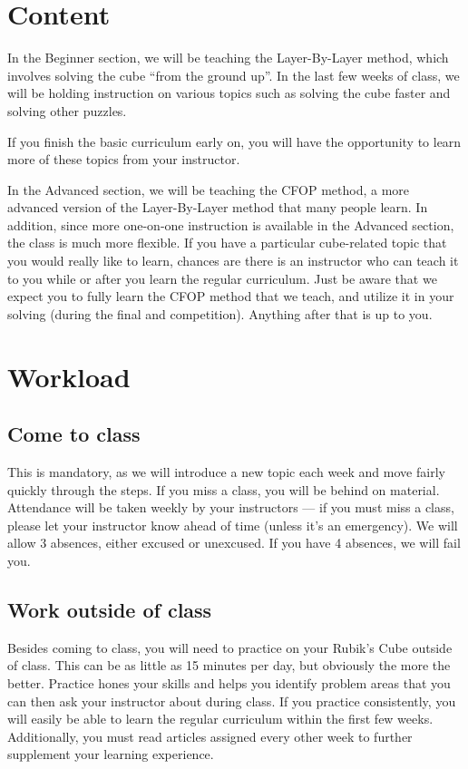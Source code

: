 \documentclass[11pt]{article}
\begin{document}
\section*{Content}
In the Beginner section, we will be teaching the Layer-By-Layer method, which involves solving the cube “from the ground up”. In the last few weeks of class, we will be holding instruction on various topics such as solving the cube faster and solving other puzzles. 

If you finish the basic curriculum early on, you will have the opportunity to learn more of these topics from your instructor.

In the Advanced section, we will be teaching the CFOP method, a more advanced version of the Layer-By-Layer method that many people learn. In addition, since more one-on-one instruction is available in the Advanced section, the class is much more flexible. If you have a particular cube-related topic that you would really like to learn, chances are there is an instructor who can teach it to you while or after you learn the regular curriculum. Just be aware that we expect you to fully learn the CFOP method that we teach, and utilize it in your solving (during the final and competition). Anything after that is up to you.



\section*{Workload}
\subsection*{Come to class}
This is mandatory, as we will introduce a new topic each week and move fairly quickly through the steps. If you miss a class, you will be behind on material. Attendance will be taken weekly by your instructors — if you must miss a class, please let your instructor know ahead of time (unless it’s an emergency). We will allow 3 absences, either excused or unexcused. If you have 4 absences, we will fail you.

\subsection*{Work outside of class}
Besides coming to class, you will need to practice on your Rubik’s Cube outside of class. This can be as little as 15 minutes per day, but obviously the more the better. Practice hones your skills and helps you identify problem areas that you can then ask your instructor about during class. If you practice consistently, you will easily be able to learn the regular curriculum within the first few weeks.  Additionally, you must read articles assigned every other week to further supplement your learning experience.
\end{document}

